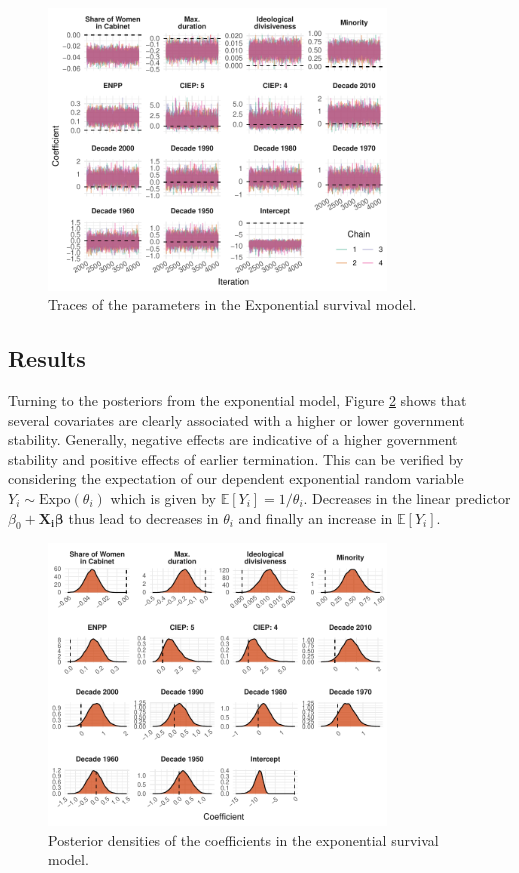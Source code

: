 \documentclass[11pt]{article}
\newcommand\minp[1]{\begin{minipage}{0.8\textwidth} #1 \end{minipage}}
\begin{document}
\begin{figure}[!ht]
    \centering
    \minp{\caption{Traces of the parameters in the Exponential survival model.} \label{fig:exp_convergence}}
    \includegraphics[width = 0.8\textwidth]{figures/fig2_exp_convergence.pdf}
\end{figure}

\subsection{Results}
Turning to the posteriors from the exponential model, Figure \ref{fig:exp_coefplot} shows that several covariates are clearly associated with a higher or lower government stability. Generally, negative effects are indicative of a higher government stability and positive effects of earlier termination. This can be verified by considering the expectation of our dependent exponential random variable $Y_i \sim \text{Expo}(\theta_i)$ which is given by $\mathbb{E}\left[Y_i\right] = 1/\theta_i$. Decreases in the linear predictor $\beta_0 + \bm{X_i\beta}$ thus lead to decreases in $\theta_i$ and finally an increase in  $\mathbb{E}\left[Y_i\right]$.

\begin{figure}[!ht]
    \centering
    \minp{\caption{Posterior densities of the coefficients in the exponential survival model.} \label{fig:exp_coefplot}}
    \includegraphics[width = 0.8\textwidth]{figures/fig1_exp_coefplot.pdf}
\end{figure}
\end{document}
